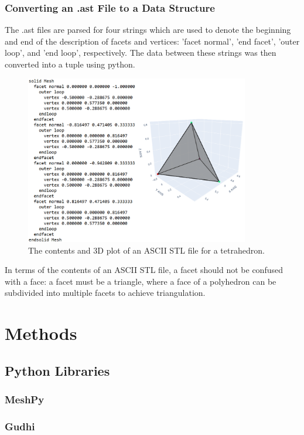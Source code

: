 \documentclass[ma]{uncgdissertationexp}
\theoremstyle{plain}
\theoremstyle{definition}
\theoremstyle{remark}
\begin{document}
\subsection{Converting an .ast File to a Data Structure}
The .ast files are parsed for four strings which are used to denote the beginning and end of the description of facets and vertices: 'facet normal', 'end facet', 'outer loop', and 'end loop', respectively. The data between these strings was then converted into a tuple using python.
\begin{figure}[H]
    \begin{center}
    \includegraphics[height=2.9in]{tetrahedron_ast_code_and_plot.png}
    \caption{The contents and 3D plot of an ASCII STL file for a tetrahedron.}
    \label{fig:ast_tetrahedron}
    \end{center}
\end{figure}
\noindent In terms of the contents of an ASCII STL file, a facet should not be confused with a face: a facet must be a triangle, where a face of a polyhedron can be subdivided into multiple facets to achieve triangulation.
\newpage

\chapter{Methods}

\section{Python Libraries}
	\subsection{MeshPy}
	
	\subsection{Gudhi}
\end{document}
